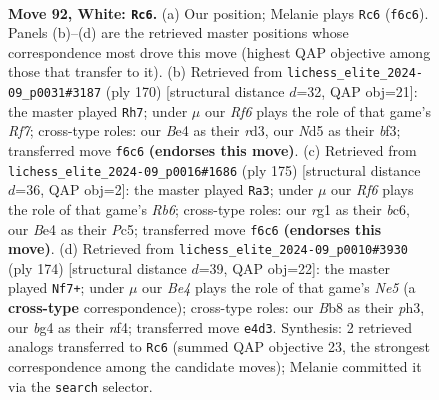 \documentclass[11pt]{article}
\begin{document}
\clearpage

\begin{figure}[p]\centering
\begin{subfigure}{0.46\textwidth}\centering
\resizebox{\linewidth}{!}{%
\newchessgame
\chessboard[
  setfen={1B6/6k1/1P3R2/3N4/P3B1b1/1K5p/8/6r1 w - - 5 92},
  showmover=false,
  pgfstyle=straightmove, color=movearrow, markmove={f6-c6}
]}
\caption{}
\end{subfigure}\hfill
\begin{subfigure}{0.46\textwidth}\centering
\resizebox{\linewidth}{!}{%
\newchessgame
\chessboard[
  setfen={4k3/5R2/8/4B2p/1KP5/3r1bP1/8/8 w - - 61 86},
  showmover=false,
  pgfstyle=straightmove, color=movearrow, markmove={f7-h7}
]}
\caption{}
\end{subfigure}
\\[4pt]
\begin{subfigure}{0.46\textwidth}\centering
\resizebox{\linewidth}{!}{%
\newchessgame
\chessboard[
  setfen={8/6kp/2B5/2p2b2/1pP2P2/1r6/4K3/8 b - - 3 88},
  showmover=false,
  pgfstyle=straightmove, color=movearrow, markmove={b3-a3}
]}
\caption{}
\end{subfigure}\hfill
\begin{subfigure}{0.46\textwidth}\centering
\resizebox{\linewidth}{!}{%
\newchessgame
\chessboard[
  setfen={b7/8/5B1k/4N1R1/5n2/KP5p/7P/8 w - - 0 88},
  showmover=false,
  pgfstyle=straightmove, color=movearrow, markmove={e5-f7}
]}
\caption{}
\end{subfigure}
\caption{\textbf{Move 92, White: \texttt{Rc6}.} (a) Our position; Melanie plays \texttt{Rc6} (\texttt{f6c6}). Panels (b)--(d) are the retrieved master positions whose correspondence most drove this move (highest QAP objective among those that transfer to it). (b) Retrieved from \texttt{lichess\_elite\_2024-09\_p0031\#3187} (ply 170) [structural distance $d$=32, QAP obj=21]: the master played \texttt{Rh7}; under $\mu$ our \emph{Rf6} plays the role of that game's \emph{Rf7}; cross-type roles: our \emph{B}e4 as their \emph{r}d3, our \emph{N}d5 as their \emph{b}f3; transferred move \texttt{f6c6} \textbf{(endorses this move)}. (c) Retrieved from \texttt{lichess\_elite\_2024-09\_p0016\#1686} (ply 175) [structural distance $d$=36, QAP obj=2]: the master played \texttt{Ra3}; under $\mu$ our \emph{Rf6} plays the role of that game's \emph{Rb6}; cross-type roles: our \emph{r}g1 as their \emph{b}c6, our \emph{B}e4 as their \emph{P}c5; transferred move \texttt{f6c6} \textbf{(endorses this move)}. (d) Retrieved from \texttt{lichess\_elite\_2024-09\_p0010\#3930} (ply 174) [structural distance $d$=39, QAP obj=22]: the master played \texttt{Nf7+}; under $\mu$ our \emph{Be4} plays the role of that game's \emph{Ne5} (a \textbf{cross-type} correspondence); cross-type roles: our \emph{B}b8 as their \emph{p}h3, our \emph{b}g4 as their \emph{n}f4; transferred move \texttt{e4d3}. Synthesis: 2 retrieved analogs transferred to \texttt{Rc6} (summed QAP objective 23, the strongest correspondence among the candidate moves); Melanie committed it via the \texttt{search} selector.}
\label{fig:thought-m182}
\end{figure}
\end{document}
